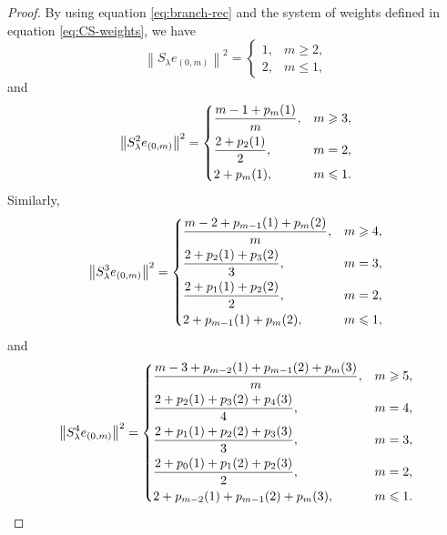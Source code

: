 \documentclass[11pt, reqno, a4paper]{amsart}
\theoremstyle{definition}
\newcommand{\norm}[1]{\left\lVert #1 \right\rVert}
\renewcommand{\leq}{\leqslant}
\renewcommand{\geq}{\geqslant}
\numberwithin{equation}{section}
\begin{document}
\begin{proof}
        By using equation \eqref{eq:branch-rec} and the system of weights defined in equation \eqref{eq:CS-weights}, we have
        \begin{equation*}
            \norm{S_\lambda e_{(0,m)}}^2 =
            \begin{cases}
                1, & m\geq2,\\
                2, & m\leq1,
            \end{cases}
        \end{equation*}
        and
        \begin{equation*}
            \norm{S_\lambda^2 e_{(0,m)}}^2 =
                \begin{dcases}
                    \frac{m-1+p_m(1)}{m}, & m\geq3, \\
                    \frac{2+p_2(1)}{2}, & m=2, \\
                    2+p_m(1), & m\leq1.
                \end{dcases}
        \end{equation*}
        Similarly,
        \begin{equation*}
            \norm{S_\lambda^3 e_{(0,m)}}^2 =
                \begin{dcases}
                    \frac{m-2+p_{m-1}(1)+p_m(2)}{m}, & m\geq4,\\
                    \frac{2+p_2(1)+p_3(2)}{3}, & m=3,\\
                    \frac{2+p_1(1)+p_2(2)}{2}, & m=2,\\
                    2+p_{m-1}(1)+p_m(2), & m\leq1,
                \end{dcases}
        \end{equation*}
        and
        \begin{equation*}
        \norm{S_\lambda^4 e_{(0,m)}}^2 =
            \begin{dcases}
                \frac{m-3+p_{m-2}(1)+p_{m-1}(2)+p_m(3)}{m}, & m\geq5,\\
                \frac{2+p_2(1)+p_3(2)+p_4(3)}{4}, & m=4,\\
                \frac{2+p_1(1)+p_2(2)+p_3(3)}{3}, & m=3,\\
                \frac{2+p_0(1)+p_1(2)+p_2(3)}{2}, & m=2,\\
                2+p_{m-2}(1)+p_{m-1}(2)+p_m(3), & m\leq1.
            \end{dcases}
        \end{equation*}
    

\end{proof}
\end{document}
